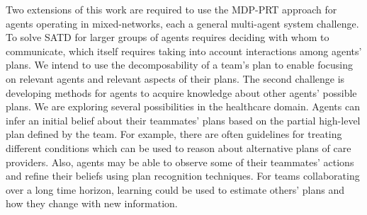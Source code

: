 Two extensions of this work are required to use the MDP-PRT approach for agents operating in  mixed-networks, each a general multi-agent system challenge. To solve SATD for larger groups of agents requires deciding with whom to communicate, which itself requires taking into account interactions among agents' plans. We intend to use the decomposability of a team's plan to enable focusing on relevant agents and relevant aspects of their plans. The second challenge is developing methods for agents to acquire knowledge about other agents' possible plans. We are exploring several possibilities in the healthcare domain. Agents can infer an initial belief about their teammates' plans based on the partial high-level plan defined by the team. For example,  there are often guidelines for treating different conditions which can be used to reason about alternative plans of care providers. 
Also, agents may be able to observe some of their teammates' actions and refine their beliefs using plan recognition techniques. For teams collaborating over a long time horizon, learning could be used to estimate others' plans and how they change with new information.


